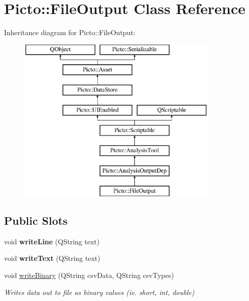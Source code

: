 \hypertarget{class_picto_1_1_file_output}{\section{Picto\-:\-:File\-Output Class Reference}
\label{class_picto_1_1_file_output}
}
Inheritance diagram for Picto\-:\-:File\-Output\-:\begin{figure}[H]
\begin{center}
\leavevmode
\includegraphics[height=8.000000cm]{class_picto_1_1_file_output}
\end{center}
\end{figure}
\subsection*{Public Slots}
\begin{DoxyCompactItemize}
\item 
\hypertarget{class_picto_1_1_file_output_a0e2d85d927a6b045ee243f6260511bdb}{void {\bfseries write\-Line} (Q\-String text)}\label{class_picto_1_1_file_output_a0e2d85d927a6b045ee243f6260511bdb}

\item 
\hypertarget{class_picto_1_1_file_output_a26177867c0868a8aa5a5c9f0b3bd1586}{void {\bfseries write\-Text} (Q\-String text)}\label{class_picto_1_1_file_output_a26177867c0868a8aa5a5c9f0b3bd1586}

\item 
void \hyperlink{class_picto_1_1_file_output_ad087bc32a2b3dddc73b1c0879c3768a1}{write\-Binary} (Q\-String csv\-Data, Q\-String csv\-Types)
\begin{DoxyCompactList}\small\item\em Writes data out to file as binary values (ie. short, int, double) \end{DoxyCompactList}\end{DoxyCompactItemize}

